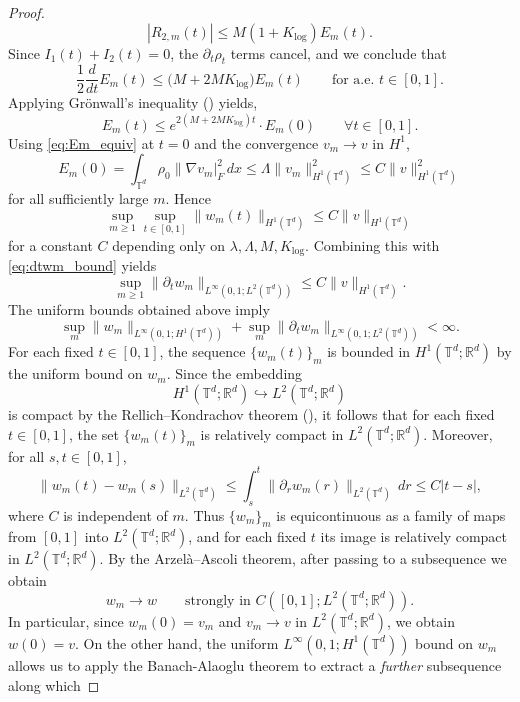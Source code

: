 \documentclass[11pt]{article}
\begin{document}
\begin{proof}
\[    |R_{2,m}(t)|\le M(1+K_{\log})E_m(t).
    \]
    Since $I_1(t)+I_2(t)=0$, the $\partial_t\rho_t$ terms cancel, and we conclude that
    \[
    \frac12 \frac{d}{dt}E_m(t)
    \le \bigl(M+2MK_{\log}\bigr) E_m(t)
    \qquad\text{for a.e. }t\in[0,1].
    \]
    Applying Gr\"onwall's inequality () yields,
    \[
    E_m(t)\le e^{2(M+2MK_{\log})t} \cdot E_m(0)
    \qquad\forall t\in[0,1].
    \]
    Using \cref{eq:Em_equiv} at $t=0$ and the convergence $v_m\to v$ in $H^1$,
    \[
    E_m(0)=\int_{\mathbb T^d}\rho_0 \|\nabla v_m
    |_F^2\,dx
    \le \Lambda \|v_m\|_{H^1(\mathbb T^d)}^2
    \le C\|v\|_{H^1(\mathbb T^d)}^2
    \]
    for all sufficiently large $m$. Hence
    \[
    \sup_{m\ge 1}\sup_{t\in[0,1]}\|w_m(t)\|_{H^1(\mathbb T^d)}
    \le C\|v\|_{H^1(\mathbb T^d)}
    \]
    for a constant $C$ depending only on $\lambda,\Lambda,M,K_{\log}$. Combining this with \cref{eq:dtwm_bound} yields
    \[
    \sup_{m\ge 1}\|\partial_t w_m\|_{L^\infty(0,1;L^2(\mathbb T^d))}
    \le C\|v\|_{H^1(\mathbb T^d)}.
    \]
    The uniform bounds obtained above imply
    \[
    \sup_m \|w_m\|_{L^\infty(0,1;H^1(\mathbb T^d))}
    +
    \sup_m \|\partial_t w_m\|_{L^\infty(0,1;L^2(\mathbb T^d))}
    <\infty.
    \]
    For each fixed $t \in [0,1]$, the sequence $\{w_m(t)\}_m$ is bounded in
    $H^1(\mathbb{T}^d;\mathbb{R}^d)$ by the uniform bound on
    $w_m$. Since the embedding
    \[
    H^1(\mathbb{T}^d;\mathbb{R}^d)\hookrightarrow L^2(\mathbb{T}^d;\mathbb{R}^d)
    \]
    is compact by the Rellich--Kondrachov theorem (\citet[\S 5.7]{evans2022partial}),
    it follows that for each fixed $t \in [0,1]$, the set
    $\{w_m(t)\}_m$ is relatively compact in $L^2(\mathbb{T}^d;\mathbb{R}^d)$.
    Moreover, for all $s,t \in [0,1]$,
    \[
    \|w_m(t)-w_m(s)\|_{L^2(\mathbb{T}^d)}
    \le \int_s^t \|\partial_r w_m(r)\|_{L^2(\mathbb{T}^d)}\,dr
    \le C|t-s|,
    \]
    where $C$ is independent of $m$. Thus $\{w_m\}_m$ is equicontinuous as a family
    of maps from $[0,1]$ into $L^2(\mathbb{T}^d;\mathbb{R}^d)$, and for each fixed
    $t$ its image is relatively compact in $L^2(\mathbb{T}^d;\mathbb{R}^d)$.
    By the Arzel\`a--Ascoli theorem, after passing to a subsequence we obtain
    \[
    w_m \to w
    \qquad\text{strongly in } C([0,1];L^2(\mathbb{T}^d;\mathbb{R}^d)).
    \] In particular, since $w_m(0)=v_m$ and $v_m\to v$ in $L^2(\mathbb T^d;\mathbb R^d)$, we obtain $w(0) = v$. On the other hand, the uniform $L^\infty(0,1;H^1(\mathbb{T}^d))$ bound on $w_m$ allows us to apply the Banach-Alaoglu theorem \citep[Theorem 3.15]{rudin1991functional} to extract a \textit{further} subsequence along which

\end{proof}
\end{document}
